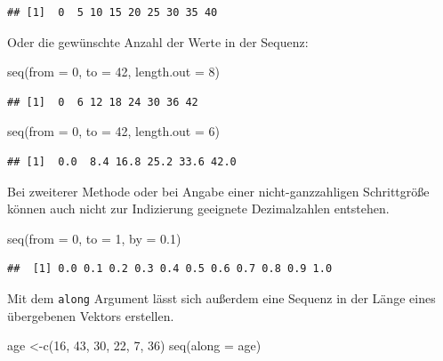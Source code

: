 \documentclass[
]{book}
\newenvironment{Shaded}{\begin{snugshade}}{\end{snugshade}}
\newcommand{\AttributeTok}[1]{\textcolor[rgb]{0.77,0.63,0.00}{#1}}
\newcommand{\DecValTok}[1]{\textcolor[rgb]{0.00,0.00,0.81}{#1}}
\newcommand{\FloatTok}[1]{\textcolor[rgb]{0.00,0.00,0.81}{#1}}
\newcommand{\FunctionTok}[1]{\textcolor[rgb]{0.00,0.00,0.00}{#1}}
\newcommand{\NormalTok}[1]{#1}
\newcommand{\OtherTok}[1]{\textcolor[rgb]{0.56,0.35,0.01}{#1}}
\begin{document}
\begin{verbatim}
## [1]  0  5 10 15 20 25 30 35 40
\end{verbatim}

Oder die gewünschte Anzahl der Werte in der Sequenz:

\begin{Shaded}
\begin{Highlighting}[]
\FunctionTok{seq}\NormalTok{(}\AttributeTok{from =} \DecValTok{0}\NormalTok{, }\AttributeTok{to =} \DecValTok{42}\NormalTok{, }\AttributeTok{length.out =} \DecValTok{8}\NormalTok{)}
\end{Highlighting}
\end{Shaded}

\begin{verbatim}
## [1]  0  6 12 18 24 30 36 42
\end{verbatim}

\begin{Shaded}
\begin{Highlighting}[]
\FunctionTok{seq}\NormalTok{(}\AttributeTok{from =} \DecValTok{0}\NormalTok{, }\AttributeTok{to =} \DecValTok{42}\NormalTok{, }\AttributeTok{length.out =} \DecValTok{6}\NormalTok{)}
\end{Highlighting}
\end{Shaded}

\begin{verbatim}
## [1]  0.0  8.4 16.8 25.2 33.6 42.0
\end{verbatim}

Bei zweiterer Methode oder bei Angabe einer nicht-ganzzahligen Schrittgröße können auch nicht zur Indizierung geeignete Dezimalzahlen entstehen.

\begin{Shaded}
\begin{Highlighting}[]
\FunctionTok{seq}\NormalTok{(}\AttributeTok{from =} \DecValTok{0}\NormalTok{, }\AttributeTok{to =} \DecValTok{1}\NormalTok{, }\AttributeTok{by =} \FloatTok{0.1}\NormalTok{)}
\end{Highlighting}
\end{Shaded}

\begin{verbatim}
##  [1] 0.0 0.1 0.2 0.3 0.4 0.5 0.6 0.7 0.8 0.9 1.0
\end{verbatim}

Mit dem \texttt{along} Argument lässt sich außerdem eine Sequenz in der Länge eines übergebenen Vektors erstellen.

\begin{Shaded}
\begin{Highlighting}[]
\NormalTok{age }\OtherTok{\textless{}{-}}\FunctionTok{c}\NormalTok{(}\DecValTok{16}\NormalTok{, }\DecValTok{43}\NormalTok{, }\DecValTok{30}\NormalTok{, }\DecValTok{22}\NormalTok{,  }\DecValTok{7}\NormalTok{, }\DecValTok{36}\NormalTok{)}
\FunctionTok{seq}\NormalTok{(}\AttributeTok{along =}\NormalTok{ age)}
\end{Highlighting}
\end{Shaded}
\end{document}
